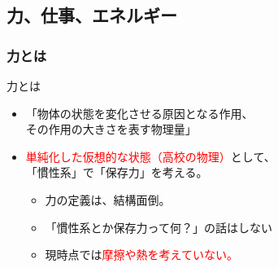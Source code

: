 \documentclass[unicode,12pt,aspectratio=169]{beamer}
\begin{document}
\subsection{力、仕事、エネルギー}
\begin{frame}
	\frametitle{力とは}
	\begin{block}{力とは}
		\begin{itemize}
			\item 「物体の状態を変化させる原因となる作用、\\
			その作用の大きさを表す物理量」
			\item \textcolor{red}{単純化した仮想的な状態（高校の物理）}として、\\
			「慣性系」で「保存力」を考える。 
			\begin{itemize}
				\item 力の定義は、結構面倒。
				\item「慣性系とか保存力って何？」の話はしない
				\item 現時点では\textcolor{red}{摩擦や熱を考えていない。}
			\end{itemize}
		\end{itemize}
	\end{block}
\end{frame}
\end{document}
